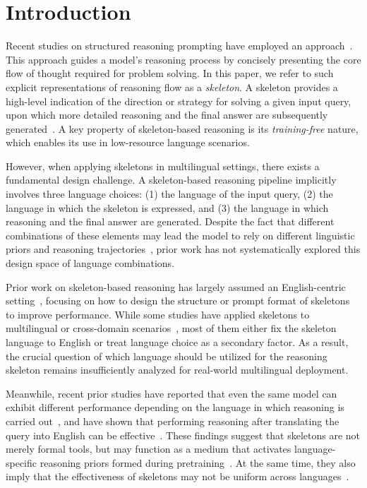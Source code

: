 \section{Introduction}

Recent studies on structured reasoning prompting have employed an approach~\citep{wang2023plan, khot2022decomposed}.
This approach guides a model’s reasoning process by concisely presenting the core flow of thought required for problem solving. In this paper, we refer to such explicit representations of reasoning flow as a \textit{skeleton}. A skeleton provides a high-level indication of the direction or strategy for solving a given input query, upon which more detailed reasoning and the final answer are subsequently generated~\citep{ning2023skeleton,li2024eliciting,qi2025sot}. A key property of skeleton-based reasoning is its \emph{training-free} nature, which enables its use in low-resource language scenarios.

However, when applying skeletons in multilingual settings, there exists a fundamental design challenge. A skeleton-based reasoning pipeline implicitly involves three language choices: (1) the language of the input query, (2) the language in which the skeleton is expressed, and (3) the language in which reasoning and the final answer are generated. Despite the fact that different combinations of these elements may lead the model to rely on different linguistic priors and reasoning trajectories~\citep{wang-etal-2025-language-mixing, wang2024seaeval}, prior work has not systematically explored this design space of language combinations.

Prior work on skeleton-based reasoning has largely assumed an English-centric setting~\citep{zhou2022least,qi2025sot}, focusing on how to design the structure or prompt format of skeletons to improve performance. While some studies have applied skeletons to multilingual or cross-domain scenarios~\citep{clp-emnlp2023,xlt-emnlp2023}, most of them either fix the skeleton language to English or treat language choice as a secondary factor. As a result, the crucial question of which language should be utilized for the reasoning skeleton remains insufficiently analyzed for real-world multilingual deployment.

Meanwhile, recent prior studies have reported that even the same model can exhibit different performance depending on the language in which reasoning is carried out~\citep{qi2025models}, and have shown that performing reasoning after translating the query into English can be effective~\citep{shi2022language,trans-allneed-2025naacl, zhu2024question}. These findings suggest that skeletons are not merely formal tools, but may function as a medium that activates language-specific reasoning priors formed during pretraining~\citep{etxaniz2024multilingual}. At the same time, they also imply that the effectiveness of skeletons may not be uniform across languages~\citep{qian2024large, chen2023breaking}.

